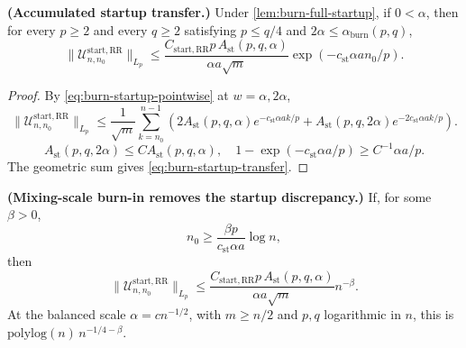\begin{lemma}\label{lem:burn-startup-transfer}
  \textbf{(Accumulated startup transfer.)}
  Under \cref{lem:burn-full-startup}, if
  $0 < \alpha$, then
  for every $p \ge 2$ and every $q \ge 2$ satisfying $p \le q / 4$ and
  $2 \alpha \le \alpha_{\mathrm{burn}}(p,q)$,
  \begin{equation}
\lVert \mathcal{U}_{n,n_{0}}^{\mathrm{start,RR}} \rVert_{L_{p}}
    \le \frac{C_{\mathrm{start,RR}} p \, A_{\mathrm{st}}(p,q,\alpha)}{\alpha a \sqrt{m}}
       \exp\left(-c_{\mathrm{st}} \alpha a n_{0} / p\right).
\label{eq:burn-startup-transfer}
\end{equation}
\end{lemma}

\begin{proof} By \eqref{eq:burn-startup-pointwise} at $w = \alpha, 2 \alpha$,
\[
\lVert \mathcal{U}_{n,n_{0}}^{\mathrm{start,RR}} \rVert_{L_{p}}
  \le \frac{1}{\sqrt{m}} \sum_{k = n_{0}}^{n - 1}
    \left( 2 A_{\mathrm{st}}(p,q,\alpha) e^{-c_{\mathrm{st}} \alpha a k / p}
      + A_{\mathrm{st}}(p,q,2 \alpha) e^{-2 c_{\mathrm{st}} \alpha a k / p} \right).
\]
\[
A_{\mathrm{st}}(p,q,2 \alpha) \le C A_{\mathrm{st}}(p,q,\alpha),
\quad
1 - \exp\left(-c_{\mathrm{st}} \alpha a / p\right) \ge C^{-1} \alpha a / p.
\]
The geometric sum gives \eqref{eq:burn-startup-transfer}. \end{proof}

\begin{corollary}\label{cor:burn-log-startup}
  \textbf{(Mixing-scale burn-in removes the startup discrepancy.)}
  If, for some $\beta > 0$,
  \begin{equation}
n_{0} \ge \frac{\beta p}{c_{\mathrm{st}} \alpha a} \log n,
\label{eq:burn-log-startup-condition}
\end{equation}
  then
  \begin{equation}
\lVert \mathcal{U}_{n,n_{0}}^{\mathrm{start,RR}} \rVert_{L_{p}}
    \le \frac{C_{\mathrm{start,RR}} p \, A_{\mathrm{st}}(p,q,\alpha)}{\alpha a \sqrt{m}} n^{-\beta}.
\label{eq:burn-log-startup-bound}
\end{equation}
  At the balanced scale $\alpha = c n^{-1 / 2}$, with
  $m \ge n / 2$ and $p, q$ logarithmic in $n$, this is
  $\mathrm{polylog}(n) \, n^{-1 / 4 - \beta}$.
\end{corollary}

